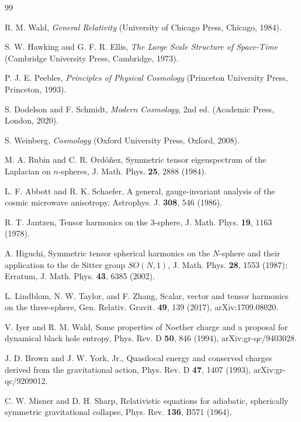 \documentclass[
  aps,
  prd,
  reprint,
  superscriptaddress,
  nofootinbib,
  floatfix,
  longbibliography
]{revtex4-2}
\begin{document}
\begin{thebibliography}{99}

R. M. Wald, \textit{General Relativity} (University of Chicago Press, Chicago, 1984).

S. W. Hawking and G. F. R. Ellis, \textit{The Large Scale Structure of Space-Time} (Cambridge University Press, Cambridge, 1973).

P. J. E. Peebles, \textit{Principles of Physical Cosmology} (Princeton University Press, Princeton, 1993).

S. Dodelson and F. Schmidt, \textit{Modern Cosmology}, 2nd ed. (Academic Press, London, 2020).

S. Weinberg, \textit{Cosmology} (Oxford University Press, Oxford, 2008).

M. A. Rubin and C. R. Ord\'{o}\~nez, Symmetric tensor eigenspectrum of the Laplacian on \(n\)-spheres, J. Math. Phys. \textbf{25}, 2888 (1984).

L. F. Abbott and R. K. Schaefer, A general, gauge-invariant analysis of the cosmic microwave anisotropy, Astrophys. J. \textbf{308}, 546 (1986).

R. T. Jantzen, Tensor harmonics on the 3-sphere, J. Math. Phys. \textbf{19}, 1163 (1978).

A. Higuchi, Symmetric tensor spherical harmonics on the \(N\)-sphere and their application to the de Sitter group \(SO(N,1)\), J. Math. Phys. \textbf{28}, 1553 (1987); Erratum, J. Math. Phys. \textbf{43}, 6385 (2002).

L. Lindblom, N. W. Taylor, and F. Zhang, Scalar, vector and tensor harmonics on the three-sphere, Gen. Relativ. Gravit. \textbf{49}, 139 (2017), arXiv:1709.08020.

V. Iyer and R. M. Wald, Some properties of Noether charge and a proposal for dynamical black hole entropy, Phys. Rev. D \textbf{50}, 846 (1994), arXiv:gr-qc/9403028.

J. D. Brown and J. W. York, Jr., Quasilocal energy and conserved charges derived from the gravitational action, Phys. Rev. D \textbf{47}, 1407 (1993), arXiv:gr-qc/9209012.

C. W. Misner and D. H. Sharp, Relativistic equations for adiabatic, spherically symmetric gravitational collapse, Phys. Rev. \textbf{136}, B571 (1964).


\end{thebibliography}
\end{document}
